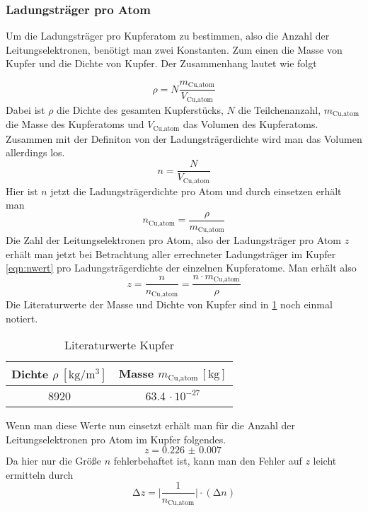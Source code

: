 \subsubsection{Ladungsträger pro Atom}
Um die Ladungsträger pro Kupferatom zu bestimmen, also die Anzahl der Leitungselektronen, benötigt man zwei Konstanten.
Zum einen die Masse von Kupfer und die Dichte von Kupfer. Der Zusammenhang lautet wie folgt

\begin{equation}
\nonumber
\rho = N \frac{m_{\text{Cu,atom}}}{V_{\text{Cu,atom}}}
\end{equation}
Dabei ist $\rho$ die Dichte des gesamten Kupferstücks, $N$ die Teilchenanzahl, $m_{\text{Cu,atom}}$ die Masse des Kupferatoms und $V_{\text{Cu,atom}}$ das Volumen des Kupferatoms.
Zusammen mit der Definiton von der Ladungsträgerdichte wird man das Volumen allerdings los.
\begin{equation}
\nonumber
n = \frac{N}{V_{\text{Cu,atom}}}
\end{equation}
Hier ist $n$ jetzt die Ladungsträgerdichte pro Atom und durch einsetzen erhält man
\begin{equation}
\nonumber
n_{\text{Cu,atom}} = \frac{\rho}{m_{\text{Cu,atom}}}
\end{equation}
Die Zahl der Leitungselektronen pro Atom, also der Ladungsträger pro Atom $z$ erhält man jetzt bei Betrachtung aller errechneter Ladungsträger im Kupfer \eqref{eqn:nwert} pro 
Ladungsträgerdichte der einzelnen Kupferatome. Man erhält also
\begin{equation}
\nonumber
z = \frac{n}{n_{\text{Cu,atom}}} = \frac{n \cdot m_{\text{Cu,atom}}}{\rho}
\end{equation}
Die Literaturwerte der Masse und Dichte von Kupfer sind in \ref{tab:kupferlit} noch einmal notiert.
\begin{table}
  \centering
  \caption{Literaturwerte Kupfer}
  \label{tab:kupferlit}
  \begin{tabular}{c c }
    Dichte {$\rho \: [\si{\kilo\gram\per\meter\cubed}]$} & Masse $m_{\text{Cu,atom}} \, [\si{\kilo\gram}]$\\
    \midrule
    8920   & 63.4 $\cdot \, 10^{-27}$ \\
    \bottomrule
  \end{tabular}
\end{table}
Wenn man diese Werte nun einsetzt erhält man für die Anzahl der Leitungselektronen pro Atom im Kupfer folgendes.
\begin{equation}
z = \SI{0.226(7)}{}
\end{equation}
\newpage
Da hier nur die Größe $n$ fehlerbehaftet ist, kann man den Fehler auf $z$ leicht ermitteln durch
\begin{equation}
\increment z = \biggl| \frac{1}{n_{\text{Cu,atom}}}\biggr| \cdot (\increment n)
\end{equation}

